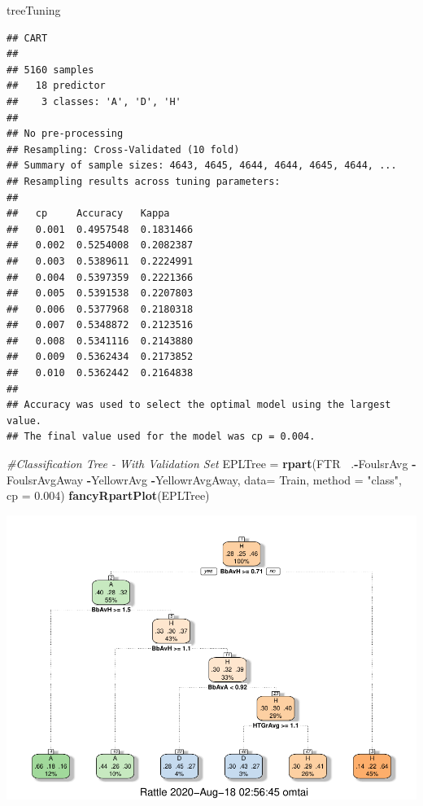 \documentclass[
]{article}
\newenvironment{Shaded}{\begin{snugshade}}{\end{snugshade}}
\newcommand{\CommentTok}[1]{\textcolor[rgb]{0.56,0.35,0.01}{\textit{#1}}}
\newcommand{\DataTypeTok}[1]{\textcolor[rgb]{0.13,0.29,0.53}{#1}}
\newcommand{\FloatTok}[1]{\textcolor[rgb]{0.00,0.00,0.81}{#1}}
\newcommand{\KeywordTok}[1]{\textcolor[rgb]{0.13,0.29,0.53}{\textbf{#1}}}
\newcommand{\NormalTok}[1]{#1}
\newcommand{\OperatorTok}[1]{\textcolor[rgb]{0.81,0.36,0.00}{\textbf{#1}}}
\newcommand{\StringTok}[1]{\textcolor[rgb]{0.31,0.60,0.02}{#1}}
\begin{document}
\begin{Shaded}
\begin{Highlighting}[]
\NormalTok{treeTuning}
\end{Highlighting}
\end{Shaded}

\begin{verbatim}
## CART 
## 
## 5160 samples
##   18 predictor
##    3 classes: 'A', 'D', 'H' 
## 
## No pre-processing
## Resampling: Cross-Validated (10 fold) 
## Summary of sample sizes: 4643, 4645, 4644, 4644, 4645, 4644, ... 
## Resampling results across tuning parameters:
## 
##   cp     Accuracy   Kappa    
##   0.001  0.4957548  0.1831466
##   0.002  0.5254008  0.2082387
##   0.003  0.5389611  0.2224991
##   0.004  0.5397359  0.2221366
##   0.005  0.5391538  0.2207803
##   0.006  0.5377968  0.2180318
##   0.007  0.5348872  0.2123516
##   0.008  0.5341116  0.2143880
##   0.009  0.5362434  0.2173852
##   0.010  0.5362442  0.2164838
## 
## Accuracy was used to select the optimal model using the largest value.
## The final value used for the model was cp = 0.004.
\end{verbatim}

\begin{Shaded}
\begin{Highlighting}[]
\CommentTok{#Classification Tree - With Validation Set}
\NormalTok{EPLTree =}\StringTok{ }\KeywordTok{rpart}\NormalTok{(FTR}\OperatorTok{~}\StringTok{ }\NormalTok{.}\OperatorTok{-}\NormalTok{FoulsrAvg  }\OperatorTok{-}\NormalTok{FoulsrAvgAway }\OperatorTok{-}\NormalTok{YellowrAvg }\OperatorTok{-}\NormalTok{YellowrAvgAway, }\DataTypeTok{data=}\NormalTok{ Train, }\DataTypeTok{method =} \StringTok{"class"}\NormalTok{,  }\DataTypeTok{cp =} \FloatTok{0.004}\NormalTok{)}
\KeywordTok{fancyRpartPlot}\NormalTok{(EPLTree)}
\end{Highlighting}
\end{Shaded}

\begin{center}\includegraphics{EPL_Model_files/figure-latex/unnamed-chunk-8-5} \end{center}
\end{document}
